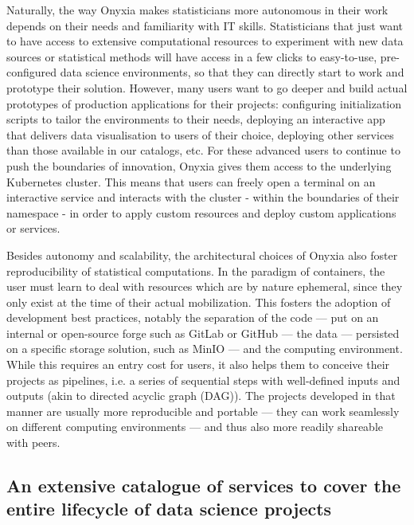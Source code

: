 Naturally, the way Onyxia makes statisticians more autonomous in their work depends on their needs and familiarity with IT skills. Statisticians that just want to have access to extensive computational resources to experiment with new data sources or statistical methods will have access in a few clicks to easy-to-use, pre-configured data science environments, so that they can directly start to work and prototype their solution. However, many users want to go deeper and build actual prototypes of production applications for their projects: configuring initialization scripts to tailor the environments to their needs, deploying an interactive app that delivers data visualisation to users of their choice, deploying other services than those available in our catalogs, etc. For these advanced users to continue to push the boundaries of innovation, Onyxia gives them access to the underlying Kubernetes cluster. This means that users can freely open a terminal on an interactive service and interacts with the cluster - within the boundaries of their namespace - in order to apply custom resources and deploy custom applications or services.

Besides autonomy and scalability, the architectural choices of Onyxia also foster reproducibility of statistical computations. In the paradigm of containers, the user must learn to deal with resources which are by nature ephemeral, since they only exist at the time of their actual mobilization. This fosters the adoption of development best practices, notably the separation of the code — put on an internal or open-source forge such as GitLab or GitHub — the data — persisted on a specific storage solution, such as MinIO — and the computing environment. While this requires an entry cost for users, it also helps them to conceive their projects as pipelines, i.e. a series of sequential steps with well-defined inputs and outputs (akin to directed acyclic graph (DAG)). The projects developed in that manner are usually more reproducible and portable — they can work seamlessly on different computing environments — and thus also more readily shareable with peers.


\label{ssec:catalog}
\subsection{An extensive catalogue of services to cover the entire lifecycle of data science projects}


